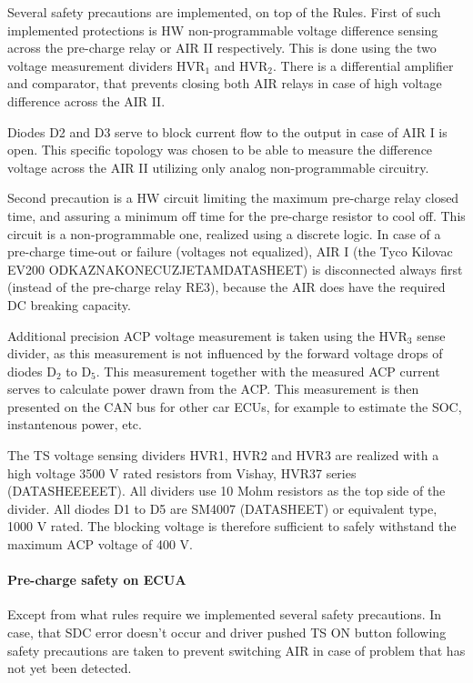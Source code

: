 Several safety precautions are implemented, on top of the Rules. First of such implemented protections is HW non-programmable voltage difference sensing across the pre-charge relay or AIR II respectively. This is done using the two voltage measurement dividers HVR$_1$ and HVR$_2$. There is a differential amplifier and comparator, that prevents closing both AIR relays in case of high voltage difference across the AIR II. 

Diodes D2 and D3 serve to block current flow to the output in case of AIR I is open. This specific topology was chosen to be able to measure the difference voltage across the AIR II utilizing only analog non-programmable circuitry.

Second precaution is a HW circuit limiting the maximum pre-charge relay closed time, and assuring a minimum off time for the pre-charge resistor to cool off. This circuit is a non-programmable one, realized using a discrete logic. In case of a pre-charge time-out or failure (voltages not equalized), AIR I (the Tyco Kilovac EV200 ODKAZNAKONECUZJETAMDATASHEET) is disconnected always first (instead of the pre-charge relay RE3), because the AIR does have the required DC breaking capacity.

Additional precision ACP voltage measurement is taken using the HVR$_3$ sense divider, as this measurement is not influenced by the forward voltage drops of diodes D$_2$ to D$_5$. This measurement together with the measured ACP current serves to calculate power drawn from the ACP. This measurement is then presented on the CAN bus for other car ECUs, for example to estimate the SOC, instantenous power, etc.  

The TS voltage sensing dividers HVR1, HVR2 and HVR3 are realized with a high voltage 3500 V rated resistors from Vishay, HVR37 series (DATASHEEEEET). All dividers use 10 Mohm resistors as the top side of the divider. All diodes D1 to D5 are SM4007 (DATASHEET) or equivalent type, 1000 V rated. The blocking voltage is therefore sufficient to safely withstand the maximum ACP voltage of 400 V.

\paragraph{Pre-charge safety on ECUA}
Except from what rules require we implemented several safety precautions. In case, that SDC error doesn’t occur and driver pushed TS ON button following safety precautions are taken to prevent switching AIR in case of problem that has not yet been detected.

